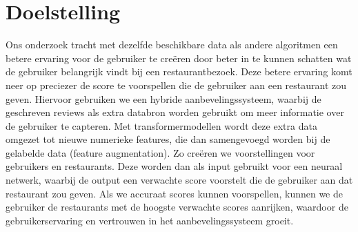 \section{Doelstelling}
Ons onderzoek tracht met dezelfde beschikbare data als andere algoritmen een betere ervaring voor de gebruiker te creëren door beter in te kunnen schatten wat de gebruiker belangrijk vindt bij een restaurantbezoek. Deze betere ervaring komt neer op preciezer de score te voorspellen die de gebruiker aan een restaurant zou geven. Hiervoor gebruiken we een hybride aanbevelingssysteem, waarbij de geschreven reviews als extra databron worden gebruikt om meer informatie over de gebruiker te capteren. Met transformermodellen wordt deze extra data omgezet tot nieuwe numerieke features, die dan samengevoegd worden bij de gelabelde data (feature augmentation). Zo creëren we voorstellingen voor gebruikers en restaurants. Deze worden dan als input gebruikt voor een neuraal netwerk, waarbij de output een verwachte score voorstelt die de gebruiker aan dat restaurant zou geven.
Als we accuraat scores kunnen voorspellen, kunnen we de gebruiker de restaurants met de hoogste verwachte scores aanrijken, waardoor de gebruikerservaring en vertrouwen in het aanbevelingssysteem groeit.
